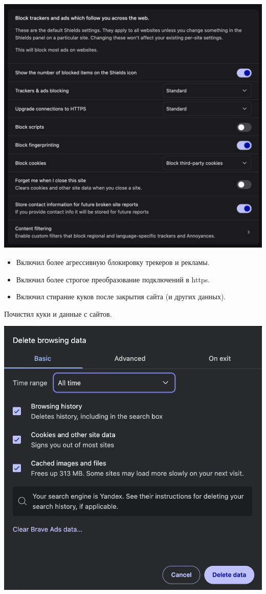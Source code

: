 \documentclass{article}
\begin{document}
\begin{center}
  \includegraphics[width=.9\textwidth]{1}
\end{center}
 
\begin{itemize}
  \item Включил более агрессивную блокировку трекеров и рекламы.
  \item Включил более строгое преобразование подключений в https.
  \item Включил стирание куков после закрытия сайта (и других данных).
\end{itemize}

Почистил куки и данные с сайтов.
\begin{center}
  \includegraphics[width=.9\textwidth]{pas}
\end{center}
\end{document}
